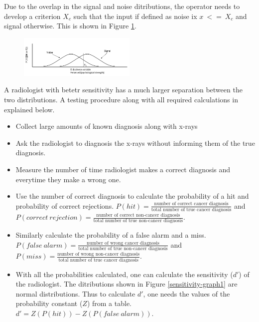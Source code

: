 \documentclass[12pt]{article}
\begin{document}
	Due to the overlap in the signal and noise ditributions, the operator needs to develop a criterion $X_c$ such that the input if defined as noise ix $x\ <=\ X_c$ and signal otherwise. This is shown in Figure \ref{graph2}.
	
	\begin{figure}[!ht]
		\centering
		\includegraphics[width=0.5\textwidth]{graph2}
		\caption{}
		\label{graph2}
	\end{figure}
	
	A radiologist with betetr sensitivity has a much larger separation between the two distributions. A testing procedure along with all required calculations in explained below.
	
	\begin{itemize}
		\item Collect large amounts of known diagnosis along with x-rays
		\item Ask the radiologist to diagnosis the x-rays without informing them of the true diagnosis.
		\item Measure the number of time radiologist makes a correct diagnosis and everytime they make a wrong one.
		\item Use the number of correct diagnosis to calculate the probability of a hit and probability of correct rejections. $P(hit)=\frac{\text{number of correct cancer diagnosis}}{\text{total number of true cancer diagnosis}}$ and $P(correct\ rejection)=\frac{\text{number of correct non-cancer diagnosis}}{\text{total number of true non-cancer diagnosis}}$.
		\item Similarly calculate the probability of a false alarm and a miss. $P(false\ alarm)=\frac{\text{number of wrong cancer diagnosis}}{\text{total number of true non-cancer diagnosis}}$ and $P(miss)=\frac{\text{number of wrong non-cancer diagnosis}}{\text{total number of true cancer diagnosis}}$.
		\item With all the probabilities calculated, one can calculate the sensitivity ($d'$) of the radiologist. The ditributions shown in Figure \ref{sensitivity-graph1} are normal distributions. Thus to calculate $d'$, one needs the values of the probability constant ($Z$) from a table. $d'=Z(P(hit))-Z(P(false\ alarm))$.
	\end{itemize}	 
	
\end{document}
